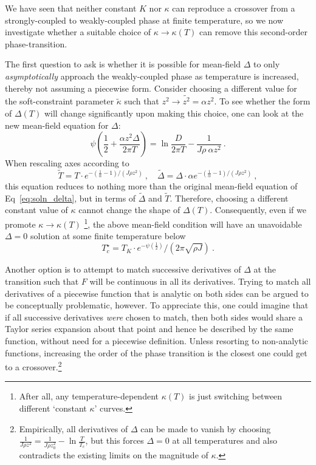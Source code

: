 We have seen that neither constant $ K $ nor $ \kappa $ can reproduce a crossover from a strongly-coupled to weakly-coupled phase at finite temperature, so we now investigate whether a suitable choice of $ \kappa \rightarrow \kappa(T) $ can remove this second-order phase-transition.

The first question to ask is whether it is possible for mean-field $ \Delta $ to only \emph{asymptotically} approach the weakly-coupled phase as temperature is increased, thereby not assuming a piecewise form. Consider choosing a different value for the soft-constraint parameter $ \widetilde{\kappa} $ such that $ z^2 \rightarrow \widetilde{z^2} = \alpha z^2 $. To see whether the form of $ \Delta(T) $ will change significantly upon making this choice, one can look at the new mean-field equation for $ \Delta $:
\begin{equation}
\psi \left( \frac{1}{2} + \frac{\alpha z^2 \Delta}{2 \pi T} \right) = \ln{\frac{D}{2 \pi T}} - \frac{1}{J \rho ~ \alpha z^2} ~ .
\end{equation}
When rescaling axes according to
\begin{equation}
\widetilde{T} = T \cdot e^{- \left( \frac{1}{\alpha} - 1 \right) / (J \rho z^2)} ~, \quad \widetilde{\Delta} = \Delta \cdot \alpha e^{- \left( \frac{1}{\alpha} - 1 \right) / (J \rho z^2)} ~ ,
\end{equation}
this equation reduces to nothing more than the original mean-field equation of Eq~\eqref{eq:soln_delta}, but in terms of $ \widetilde{\Delta} $ and $ \widetilde{T} $.
Therefore, choosing a different constant value of $ \kappa $ cannot change the shape of $ \Delta(T) $. Consequently, even if we promote $ \kappa \rightarrow \kappa(T) $ \footnote{After all, any temperature-dependent $ \kappa(T) $ is just switching between different `constant $ \kappa $' curves.}, the above mean-field condition will have an unavoidable $ \Delta = 0 $ solution at some finite temperature below
\begin{equation}
T^{\star}_c = T_K \cdot e^{- \psi \left( \frac{1}{2} \right)} / \left( 2 \pi \sqrt{\rho J} \right)~.
\end{equation}

Another option is to attempt to match successive derivatives of $ \Delta $ at the transition such that $ F $ will be continuous in all its derivatives. Trying to match all derivatives of a piecewise function that is analytic on both sides can be argued to be conceptually problematic, however. To appreciate this, one could imagine that if all successive derivatives \textit{were} chosen to match, then both sides would share a Taylor series expansion about that point and hence be described by the same function, without need for a piecewise definition. Unless resorting to non-analytic functions, increasing the order of the phase transition is the closest one could get to a crossover.\footnote{Empirically, all derivatives of $ \Delta $ can be made to vanish by choosing $ \frac{1}{J \rho z^2} = \frac{1}{J \rho z_0^2} - \ln{\frac{T}{T_c}} $, but this forces $ \Delta = 0 $ at all temperatures and also contradicts the existing limits on the magnitude of $ \kappa $.}

